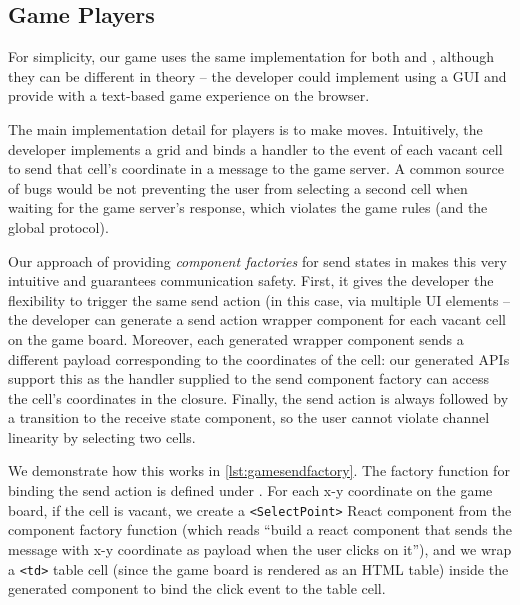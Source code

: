 \subsection{Game Players}
For simplicity, our game uses the same implementation for both
 and , although they can be different in theory --
the developer could implement  using a GUI and provide
 with a text-based game experience on the browser.

The main implementation detail for players
is to make moves. 
Intuitively, the developer implements a grid and binds a handler
to the  event of each vacant cell to send that cell's coordinate 
in a  message to the game server.
A common source of bugs would be not preventing the user from selecting
a second cell when waiting for the game server's response,
which violates the game rules (and the global protocol).

Our approach of providing \textit{component factories} for send states
in \reactcodegen makes this very intuitive and guarantees communication safety.
First, it gives the developer the flexibility to trigger
the same send action (in this case,  via multiple
UI elements -- the developer can generate a send action wrapper component 
for each vacant cell on the game board.
Moreover, each generated wrapper component sends a different payload
corresponding to the coordinates of the cell:
our generated APIs support this as the handler supplied
to the send component factory can access the cell's coordinates in the closure.
Finally, the send action is always followed by a transition to the receive
state component, so the user cannot violate channel linearity by selecting
two cells.

We demonstrate how this works in \cref{lst:gamesendfactory}.
The factory function for binding the  send action
is defined under .
For each x-y coordinate on the game board, if the cell is vacant,
we create a \texttt{<SelectPoint>} React component from the
component factory function (which reads ``build a react
component that sends the  message with x-y coordinate
as payload when the user clicks on it''), and we wrap
a \texttt{<td>} table cell (since the game board is rendered as an
HTML table) inside the generated component to bind the click event
to the table cell.

